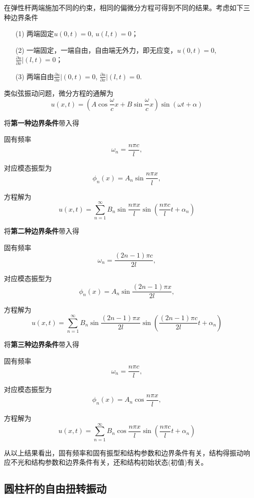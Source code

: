 在弹性杆两端施加不同的约束，相同的偏微分方程可得到不同的结果。考虑如下三种边界条件
\begin{enumerate}
    \item[(1)]两端固定$u(0,t)=0$, $u(l,t)=0$；
    \item[(2)]一端固定，一端自由，自由端无外力，即无应变，$u(0,t)=0$, $\frac{\partial u}{\partial x}|(l,t)=0$；
    \item[(3)]两端自由$\frac{\partial u}{\partial x}|(0,t)=0$, $\frac{\partial u}{\partial x}|(l,t)=0$.
\end{enumerate}

类似弦振动问题，微分方程的通解为
\begin{equation}
    u(x,t)=\left(A\cos \frac{\omega}{c}x + B\sin \frac{\omega}{c}x\right)\sin\left(\omega t + \alpha\right)
\end{equation}

\noindent 将\textbf{第一种边界条件}带入得

固有频率$$\omega_{n}=\frac{n\pi c}{l},$$

对应模态振型为$$\phi_{n}(x)=A_{n}\sin \frac{n\pi x}{l},$$

方程解为$$u(x,t)=\sum\limits_{n=1}^{\infty}B_{n}\sin\frac{n\pi x}{l}\sin \left(\frac{n\pi c}{l}t+\alpha_{n}\right)$$

\noindent 将\textbf{第二种边界条件}带入得

固有频率$$\omega_{n}=\frac{(2n-1)\pi c}{2l},$$

对应模态振型为$$\phi_{n}(x)=A_{n}\sin \frac{(2n-1)\pi x}{2l},$$

方程解为$$u(x,t)=\sum\limits_{n=1}^{\infty}B_{n}\sin\frac{(2n-1)\pi x}{2l}\sin \left(\frac{(2n-1)\pi c}{2l}t+\alpha_{n}\right)$$

\noindent 将\textbf{第三种边界条件}带入得

固有频率$$\omega_{n}=\frac{n\pi c}{l},$$

对应模态振型为$$\phi_{n}(x)=A_{n}\cos \frac{n\pi x}{l},$$

方程解为$$u(x,t)=\sum\limits_{n=1}^{\infty}B_{n}\cos\frac{n\pi x}{l}\sin \left(\frac{n\pi c}{l}t+\alpha_{n}\right)$$

从以上结果看出，固有频率和固有振型和结构参数和边界条件有关，结构得振动响应不光和结构参数和边界条件有关，还和结构初始状态(初值)有关。


\subsection{圆柱杆的自由扭转振动}

